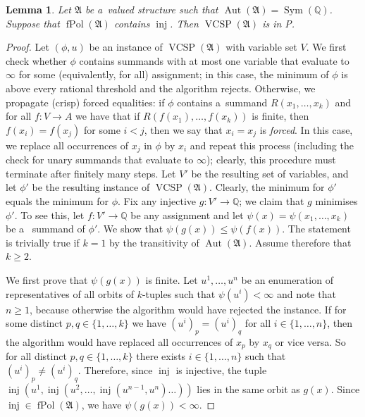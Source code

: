 \documentclass[preprint,12pt]{elsarticle}
\newcommand{\Q}{\mathbb Q}
\newcommand{\bA}{{\mathfrak A}}
\DeclareMathOperator{\Aut}{Aut}
\DeclareMathOperator{\fPol}{fPol}
\DeclareMathOperator{\vcsp}{VCSP}
\DeclareMathOperator{\Sym}{Sym}
\DeclareMathOperator{\inj}{inj}
\newtheorem{lemma}[theorem]{Lemma}
\begin{document}
\begin{lemma}\label{lem:r}
Let $\bA$ be a~valued structure such that $\Aut(\bA) = \Sym(\Q)$.
Suppose that $\fPol(\bA)$ contains $\inj$. Then $\vcsp(\bA)$ is in P. 
\end{lemma}


\begin{proof}
Let $(\phi,u)$ be an instance of $\vcsp(\bA)$ with variable set $V$.
We first check whether $\phi$ contains summands with at most one variable that evaluate to $\infty$ for some (equivalently, for all) assignment; in this case, the minimum of $\phi$ is above every rational threshold and the algorithm rejects. 
Otherwise, we propagate (crisp) forced equalities:
if $\phi$ contains a~summand $R(x_1,\dots,x_k)$ 
and for all $f \colon V \to A$ we have that 
if $R(f(x_1),\dots,f(x_k))$ is finite, then $f(x_i) = f(x_j)$ for some $i<j$, then we say that $x_i = x_j$ is \emph{forced}.
In this case, we replace all occurrences of $x_j$ in $\phi$ by $x_i$ and repeat this process (including the check for unary summands that evaluate to $\infty$); clearly, this procedure must terminate after finitely many steps. 
Let $V'$ be the resulting set of variables, and let $\phi'$ be the resulting instance of $\vcsp(\bA)$. 
Clearly, the minimum for $\phi'$ equals the minimum for $\phi$.
Fix any injective $g \colon V' \to \Q$; we claim that $g$ minimises $\phi'$.
To see this, let 
$f \colon V' \to \Q$ be any assignment and let 
$\psi(x) = \psi(x_1,\dots,x_k)$ be a~ summand 
of $\phi'$. 
We show that $\psi(g(x)) \leq \psi(f(x))$. The statement is trivially true if $k=1$ by the transitivity of $\Aut(\bA)$.
Assume therefore that $k \geq 2$.

We first prove that $\psi(g(x))$ is finite.
Let $u^1,\dots,u^n$ be an enumeration of representatives of all orbits of $k$-tuples 
such that $\psi(u^i) < \infty$ and note that $n\geq 1$, because otherwise the algorithm would have rejected the instance. If for some distinct $p,q \in \{1,\dots,k\}$ 
we have  $(u^i)_p = (u^i)_q$ for all $i \in \{1,\dots,n\}$, then 
the algorithm would have replaced all occurrences of $x_p$ by $x_q$ or vice versa.
So
for all distinct $p,q \in \{1,\dots,k\}$ 
there exists $i \in \{1,\dots,n\}$ such that 
$(u^i)_p \neq (u^i)_q$.
Therefore, 
since $\inj$ is injective, the tuple $\inj(u^1,\inj(u^2,\dots,\inj(u^{n-1},u^n)\dots))$ lies in the same orbit as $g(x)$. Since $\inj \in \fPol(\bA)$, we have
$\psi(g(x)) < \infty$.


\end{proof}
\end{document}
